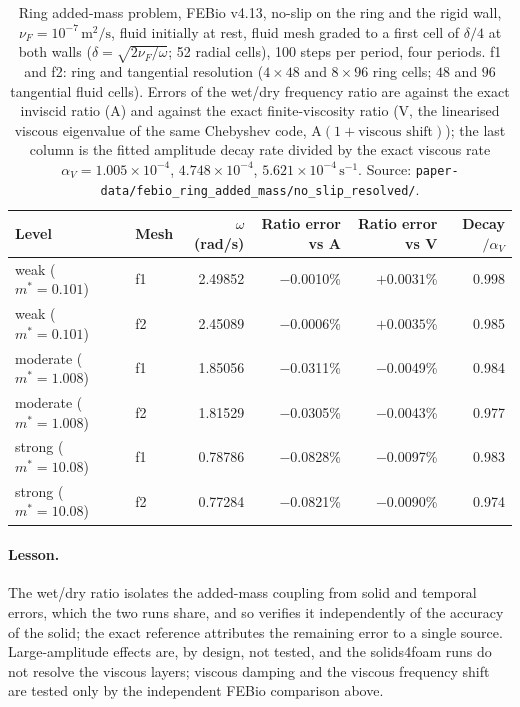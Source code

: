 \begin{table}[htbp]
	\centering
	\small
	\setlength{\tabcolsep}{4pt}
	\caption{Ring added-mass problem, FEBio v4.13, no-slip on the ring and the rigid wall, $\nu_F=10^{-7}\,\mathrm{m^2/s}$, fluid initially at rest, fluid mesh graded to a first cell of $\delta/4$ at both walls ($\delta=\sqrt{2\nu_F/\omega}$; 52 radial cells), 100 steps per period, four periods. f1 and f2: ring and tangential resolution ($4\times48$ and $8\times96$ ring cells; $48$ and $96$ tangential fluid cells). Errors of the wet/dry frequency ratio are against the exact inviscid ratio (A) and against the exact finite-viscosity ratio (V, the linearised viscous eigenvalue of the same Chebyshev code, $\mathrm{A}(1+\text{viscous shift})$); the last column is the fitted amplitude decay rate divided by the exact viscous rate $\alpha_V=1.005\times10^{-4}$, $4.748\times10^{-4}$, $5.621\times10^{-4}\,\mathrm{s^{-1}}$. Source: \texttt{paper-data/febio\_ring\_added\_mass/no\_slip\_resolved/}.}
	\label{tab:ring_febio}
	\begin{tabular}{llrrrr}
		\toprule
		Level & Mesh & $\omega$ (rad/s) & Ratio error vs A & Ratio error vs V & Decay$/\alpha_V$ \\
		\midrule
		weak ($m^*=0.101$) & f1 & 2.49852 & $-$0.0010\% & $+0.0031$\% & 0.998 \\
		weak ($m^*=0.101$) & f2 & 2.45089 & $-$0.0006\% & $+0.0035$\% & 0.985 \\
		moderate ($m^*=1.008$) & f1 & 1.85056 & $-$0.0311\% & $-$0.0049\% & 0.984 \\
		moderate ($m^*=1.008$) & f2 & 1.81529 & $-$0.0305\% & $-$0.0043\% & 0.977 \\
		strong ($m^*=10.08$) & f1 & 0.78786 & $-$0.0828\% & $-$0.0097\% & 0.983 \\
		strong ($m^*=10.08$) & f2 & 0.77284 & $-$0.0821\% & $-$0.0090\% & 0.974 \\
		\bottomrule
	\end{tabular}
\end{table}

\paragraph{Lesson.}
The wet/dry ratio isolates the added-mass coupling from solid and temporal errors, which the two runs share, and so verifies it independently of the accuracy of the solid; the exact reference attributes the remaining error to a single source.
Large-amplitude effects are, by design, not tested, and the solids4foam runs do not resolve the viscous layers; viscous damping and the viscous frequency shift are tested only by the independent FEBio comparison above.

